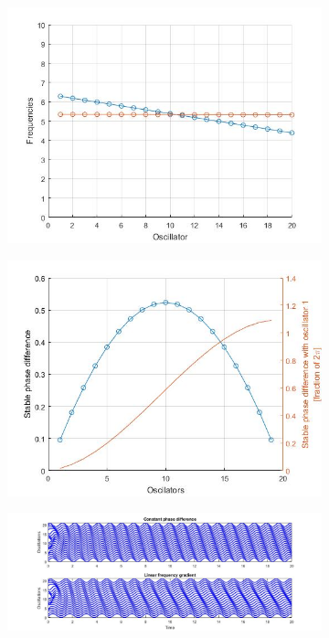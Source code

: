 \documentclass[a4paper]{scrartcl}
\begin{document}
\begin{figure}[!b]
\begin{subfigure}[b]{0.49\textwidth}
		\includegraphics[width=\textwidth]{results/6.b/compSP_DP_DPFreq.jpg}
		\caption{}\label{3c}
	\end{subfigure}
	\centering
	\begin{subfigure}[b]{0.49\textwidth}
		\centering
		\includegraphics[width=\textwidth]{results/6.b/compSP_DP_DPPhase.jpg}
		\caption{}\label{3d}
	\end{subfigure}
	\begin{subfigure}[b]{\textwidth}
		\centering
		\includegraphics[width=\textwidth]{results/6.b/compSP_DP_oscillations.jpg}

\end{subfigure}
\end{figure}
\end{document}
